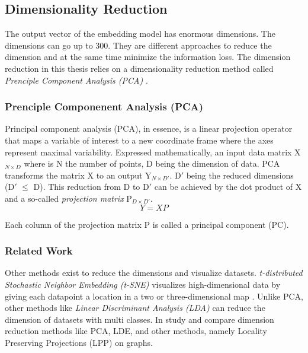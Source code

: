 \subsection{Dimensionality Reduction}
\label{subsec:dimension-reduction}
The output vector of the embedding model has enormous dimensions. The dimensions can go up to 300. They are different approaches to reduce the dimension and at the same time minimize the information loss. The dimension reduction in this thesis relies on a dimensionality reduction method called \emph{Prenciple Component Analysis (PCA)} \cite{woldPrincipalComponentAnalysis1987}.

\subsubsection{Prenciple Componenent Analysis (PCA)}
\label{subsubsec:pca}
Principal component analysis (PCA), in essence, is a linear projection operator that maps a variable of interest to a new coordinate frame where the axes represent maximal variability. Expressed mathematically, an input data matrix X$_{N \times D}$ where is N the number of points, D being the dimension of data. PCA transforms the matrix X to an output Y$_{N \times D\prime}$. D$\prime$ being the reduced dimensions (D$\prime$ $\leq$ D). This reduction from D to D$\prime$ can be achieved by the dot product of X and a so-called \emph{projection matrix} P$_{D \times D\prime}$.
    \begin{equation}
        \label{PCA}
        Y = XP
    \end{equation}

\noindent Each column of the projection matrix P is called a principal component (PC). 


\subsubsection{Related Work}
\label{subsubsec:dimension-reduction-related-work}
Other methods exist to reduce the dimensions and visualize datasets. \emph{t-distributed Stochastic Neighbor Embedding (t-SNE)} visualizes high-dimensional data by giving each datapoint a location in a two or three-dimensional map \cite{vandermaaten08}. Unlike PCA, other methods like \emph{Linear Discriminant Analysis (LDA)} \cite{martinezPCALDA2001} can reduce the dimension of datasets with multi classes. In \cite{yanGraphEmbeddingExtensions2007} study and compare dimension reduction methods like PCA, LDE, and other methods, namely Locality Preserving Projections (LPP) on graphs.
